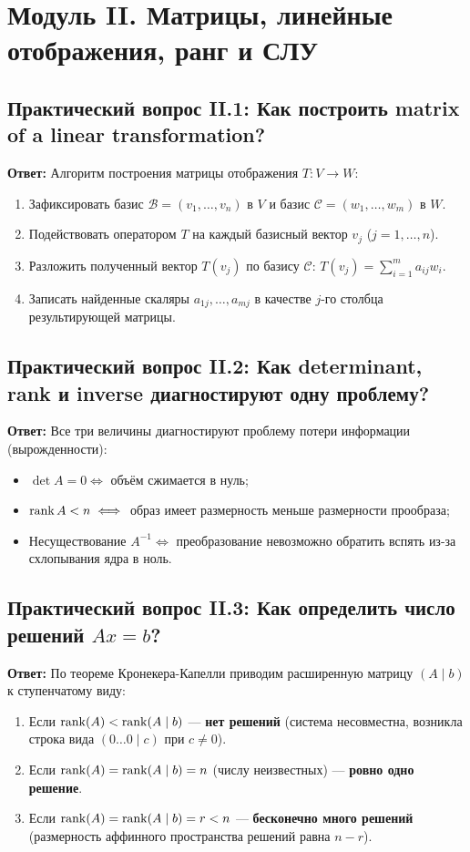 \newpage

\section{Модуль II. Матрицы, линейные отображения, ранг и СЛУ}

\subsection{Практический вопрос II.1: Как построить matrix of a linear transformation?}
\textbf{Ответ:} Алгоритм построения матрицы отображения $T \colon V \to W$:
\begin{enumerate}
    \item Зафиксировать базис $\mathcal{B} = (v_1,\dots,v_n)$ в $V$ и базис $\mathcal{C} = (w_1, \dots, w_m)$ в $W$.
    \item Подействовать оператором $T$ на каждый базисный вектор $v_j$ ($j = 1, \dots, n$).
    \item Разложить полученный вектор $T(v_j)$ по базису $\mathcal{C}$: $T(v_j) = \sum_{i=1}^m a_{ij} w_i$.
    \item Записать найденные скаляры $a_{1j}, \dots, a_{mj}$ в качестве $j$-го столбца результирующей матрицы.
\end{enumerate}

\subsection{Практический вопрос II.2: Как determinant, rank и inverse диагностируют одну проблему?}
\textbf{Ответ:} Все три величины диагностируют проблему потери информации (вырожденности):
\begin{itemize}
    \item $\det A = 0 \iff$ объём сжимается в нуль;
    \item $\operatorname{rank} A < n \iff$ образ имеет размерность меньше размерности прообраза;
    \item Несуществование $A^{-1} \iff$ преобразование невозможно обратить вспять из-за схлопывания ядра в ноль.
\end{itemize}

\subsection{Практический вопрос II.3: Как определить число решений $Ax = b$?}
\textbf{Ответ:} По теореме Кронекера-Капелли приводим расширенную матрицу $(A \mid b)$ к ступенчатому виду:
\begin{enumerate}
    \item Если $\operatorname{rank}(A) < \operatorname{rank}(A \mid b)$ — \textbf{нет решений} (система несовместна, возникла строка вида
    $(0 \dots 0 \mid c)$ при $c \ne 0$).
    \item Если $\operatorname{rank}(A) = \operatorname{rank}(A \mid b) = n$ (числу неизвестных) — \textbf{ровно одно решение}.
    \item Если $\operatorname{rank}(A) = \operatorname{rank}(A \mid b) = r < n$ — \textbf{бесконечно много решений}
    (размерность аффинного пространства решений равна $n - r$).
\end{enumerate}

